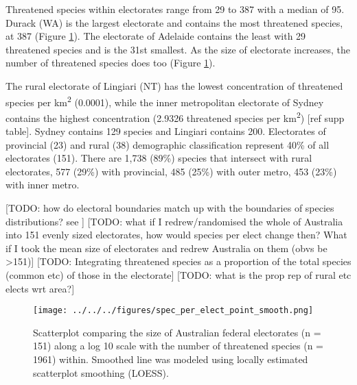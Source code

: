 \documentclass[a4paper,11pt]{article}
\begin{document}


Threatened species within electorates range from 29 to 387 with a median of 95. Durack (WA) is the largest electorate and contains the most threatened species, at 387 (Figure \ref{fig:point_smooth}). The electorate of Adelaide contains the least with 29 threatened species and is the 31st smallest. As the size of electorate increases, the number of threatened species does too (Figure \ref{fig:point_smooth}). 

The rural electorate of Lingiari (NT) has the lowest concentration of threatened species per km\textsuperscript{2} (0.0001), while the inner metropolitan electorate of Sydney contains the highest concentration (2.9326 threatened species per km\textsuperscript{2}) [ref supp table]. Sydney contains 129 species and Lingiari contains 200. Electorates of provincial (23) and rural (38) demographic classification represent 40\% of all electorates (151). There are 1,738 (89\%) species that intersect with rural electorates, 577 (29\%) with provincial, 485 (25\%) with outer metro, 453 (23\%) with inner metro. 


[TODO: how do electoral boundaries match up with the boundaries of species distributions? see \cite{hughesRedlistingRedlistGlobal2019}]
[TODO: what if I redrew/randomised the whole of Australia into 151 evenly sized electorates, how would species per elect change then? What if I took the mean size of electorates and redrew Australia on them (obvs be >151)]
[TODO: Integrating threatened species as a proportion of the total species (common etc) of those in the electorate]
[TODO: what is the prop rep of rural etc elects wrt area?]

\begin{figure}[H]
	\centering
    \texttt{[image: ../../../figures/spec\_per\_elect\_point\_smooth.png]}
    \caption{Scatterplot comparing the size of Australian federal electorates (n = 151) along a log 10 scale with the number of threatened species (n = 1961) within. Smoothed line was modeled using locally estimated scatterplot smoothing (LOESS).}
    \label{fig:point_smooth}
\end{figure}
\end{document}
